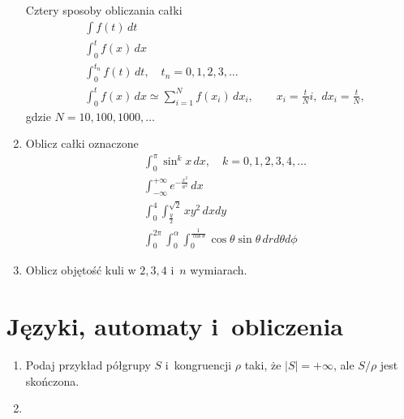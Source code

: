 \documentclass[a4paper,11pt]{article}
\begin{document}
\begin{enumerate}
  Cztery sposoby obliczania całki
  \begin{align}
    &\int f( t ) \, dt \\
    &\int_{ 0 }^{ t } f( x ) \, dx \\
    &\int_{ 0 }^{ t_{ n } } f( t ) \, dt, \quad
      t_{ n } = 0, 1, 2, 3, \ldots \\
    &\int_{ 0 }^{ t } f( x ) \, dx \simeq \sum_{ i = 1 }^{ N } f( x_{ i } ) \, dx_{ i },
      \qquad
      x_{ i } = \frac{ t }{ N } i, \; dx_{ i } = \frac{ t }{ N },
  \end{align}
  gdzie $N = 10, 100, 1000, \ldots$

\item Oblicz całki oznaczone
  \begin{align}
    &\int_{ 0 }^{ \pi } \sin^{ k } x \, dx, \quad
      k = 0, 1, 2, 3, 4, \ldots \\
    &\int_{ -\infty }^{ +\infty } e^{ -\frac{ x^{ 2 } }{ a^{ 2 } } } \, dx \\
    &\int_{ 0 }^{ 4 } \int_{ \frac{ y }{ 2 } }^{ \sqrt{ 2 } } x y^{ 2 } \, dx dy \\
    &\int_{ 0 }^{ 2\pi } \int_{ 0 }^{ \alpha } \int_{ 0 }^{ \frac{ 1 }{ \cos \theta } } \cos\theta \sin\theta \,
      dr d\theta d\phi
  \end{align}

\item Oblicz objętość kuli w $2, 3, 4$ i~$n$ wymiarach.

\end{enumerate}










\section{Języki, automaty i~obliczenia}



\begin{enumerate}

\item Podaj przykład półgrupy $S$ i~kongruencji $\rho$ taki, że $| S | = +\infty$,
  ale $S / \rho$ jest skończona.

\item

\end{enumerate}
\end{document}
